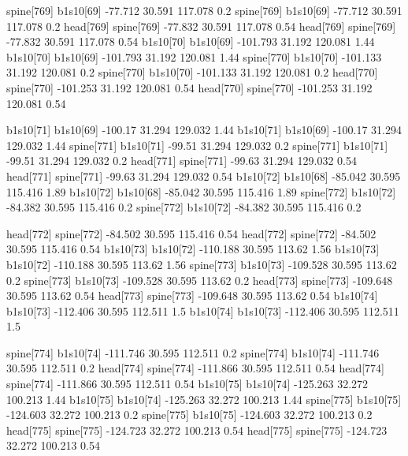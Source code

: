 spine[769]    b1s10[69]    -77.712    30.591    117.078    0.2
spine[769]    b1s10[69]    -77.712    30.591    117.078    0.2
head[769]    spine[769]    -77.832    30.591    117.078    0.54
head[769]    spine[769]    -77.832    30.591    117.078    0.54
b1s10[70]    b1s10[69]    -101.793    31.192    120.081    1.44
b1s10[70]    b1s10[69]    -101.793    31.192    120.081    1.44
spine[770]    b1s10[70]    -101.133    31.192    120.081    0.2
spine[770]    b1s10[70]    -101.133    31.192    120.081    0.2
head[770]    spine[770]    -101.253    31.192    120.081    0.54
head[770]    spine[770]    -101.253    31.192    120.081    0.54


b1s10[71]    b1s10[69]    -100.17    31.294    129.032    1.44
b1s10[71]    b1s10[69]    -100.17    31.294    129.032    1.44
spine[771]    b1s10[71]    -99.51    31.294    129.032    0.2
spine[771]    b1s10[71]    -99.51    31.294    129.032    0.2
head[771]    spine[771]    -99.63    31.294    129.032    0.54
head[771]    spine[771]    -99.63    31.294    129.032    0.54
b1s10[72]    b1s10[68]    -85.042    30.595    115.416    1.89
b1s10[72]    b1s10[68]    -85.042    30.595    115.416    1.89
spine[772]    b1s10[72]    -84.382    30.595    115.416    0.2
spine[772]    b1s10[72]    -84.382    30.595    115.416    0.2


head[772]    spine[772]    -84.502    30.595    115.416    0.54
head[772]    spine[772]    -84.502    30.595    115.416    0.54
b1s10[73]    b1s10[72]    -110.188    30.595    113.62    1.56
b1s10[73]    b1s10[72]    -110.188    30.595    113.62    1.56
spine[773]    b1s10[73]    -109.528    30.595    113.62    0.2
spine[773]    b1s10[73]    -109.528    30.595    113.62    0.2
head[773]    spine[773]    -109.648    30.595    113.62    0.54
head[773]    spine[773]    -109.648    30.595    113.62    0.54
b1s10[74]    b1s10[73]    -112.406    30.595    112.511    1.5
b1s10[74]    b1s10[73]    -112.406    30.595    112.511    1.5


spine[774]    b1s10[74]    -111.746    30.595    112.511    0.2
spine[774]    b1s10[74]    -111.746    30.595    112.511    0.2
head[774]    spine[774]    -111.866    30.595    112.511    0.54
head[774]    spine[774]    -111.866    30.595    112.511    0.54
b1s10[75]    b1s10[74]    -125.263    32.272    100.213    1.44
b1s10[75]    b1s10[74]    -125.263    32.272    100.213    1.44
spine[775]    b1s10[75]    -124.603    32.272    100.213    0.2
spine[775]    b1s10[75]    -124.603    32.272    100.213    0.2
head[775]    spine[775]    -124.723    32.272    100.213    0.54
head[775]    spine[775]    -124.723    32.272    100.213    0.54


